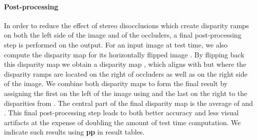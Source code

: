 \documentclass[10pt,twocolumn,letterpaper]{article}
\begin{document}
\paragraph{Post-processing} In order to reduce the effect of stereo disocclusions which create disparity ramps on both the left side of the image and of the occluders, a final post-processing step is performed on the output. 
For an input image  at test time, we also compute the disparity map  for its horizontally flipped image . 
By flipping back this disparity map we obtain a disparity map , which aligns with  but where the disparity ramps are located on the right of occluders as well as on the right side of the image. 
We combine both disparity maps to form the final result by assigning the first  on the left of the image using  and the last  on the right to the disparities from . 
The central part of the final disparity map is the average of  and . 
This final post-processing step leads to both better accuracy and less visual artifacts at the expense of doubling the amount of test time computation. We indicate such results using \textbf{pp} in result tables.
\end{document}
